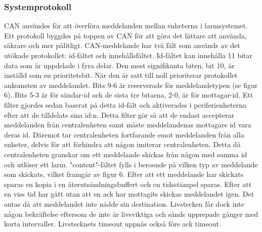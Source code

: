 \documentclass{article}
\begin{document}
\subsubsection{Systemprotokoll}
CAN användes för att överföra meddelanden mellan enheterna i larmsystemet. Ett protokoll byggdes på toppen av CAN för att göra det lättare att använda, säkrare och mer pålitligt. CAN-meddelande har två fält som används av det utökade protokollet: id-fältet och innehållsfältet. Id-fältet kan innehålla 11 bitar data som är uppdelade i fyra delar. Den mest signifikanta biten, bit 10, är inställd som en prioritetsbit. När den är satt till noll prioriterar protokollet ankomsten av meddelandet. Bits 9-6 är reserverade för meddelandetypen (se figur 6). Bits 5-3 är för sändar-id och de sista tre bitarna, 2-0, är för mottagar-id. Ett filter gjordes sedan baserat på detta id-fält och aktiverades i periferienheterna efter att de tilldelats sina id:n. Detta filter gör så att de endast accepterar meddelanden från centralenheten samt måste meddelandenas mottagare id vara deras id. Däremot tar centralenheten fortfarande emot meddelanden från alla enheter, delvis för att förhindra att någon imiterar centralenheten. Detta då centralenheten granskar om ett meddelande skickas från någon med samma id och utlöser ett larm. "content"-fältet fylls i beroende på vilken typ av meddelande som skickats, vilket framgår av figur 6. Efter att ett meddelande har skickats sparas en kopia i en återutsändningsbuffert och en tidsstämpel sparas. Efter att en viss tid har gått utan att en ack har mottagits skickas meddelandet igen. Det antas då att meddelandet inte nådde sin destination. Livstecken får dock inte någon bekräftelse eftersom de inte är livsviktiga och sänds upprepade gånger med korta intervaller. Livstecknets timeout uppnås också före ack timeout.
\end{document}

